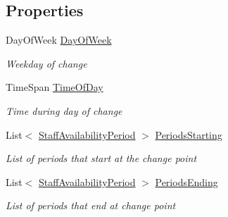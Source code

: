\subsection*{Properties}
\begin{DoxyCompactItemize}
\item 
Day\+Of\+Week \hyperlink{class_general_health_care_elements_1_1_staff_handling_1_1_staff_changing_point_a0a747e49188fd23d9830876bd79c09da}{Day\+Of\+Week}
\begin{DoxyCompactList}\small\item\em Weekday of change \end{DoxyCompactList}\item 
Time\+Span \hyperlink{class_general_health_care_elements_1_1_staff_handling_1_1_staff_changing_point_ae1e52e8a83754b946679b903b048ed95}{Time\+Of\+Day}
\begin{DoxyCompactList}\small\item\em Time during day of change \end{DoxyCompactList}\item 
List$<$ \hyperlink{class_general_health_care_elements_1_1_staff_handling_1_1_staff_availability_period}{Staff\+Availability\+Period} $>$ \hyperlink{class_general_health_care_elements_1_1_staff_handling_1_1_staff_changing_point_acc95ce624cc8b1933d607229b33bcb36}{Periods\+Starting}
\begin{DoxyCompactList}\small\item\em List of periods that start at the change point \end{DoxyCompactList}\item 
List$<$ \hyperlink{class_general_health_care_elements_1_1_staff_handling_1_1_staff_availability_period}{Staff\+Availability\+Period} $>$ \hyperlink{class_general_health_care_elements_1_1_staff_handling_1_1_staff_changing_point_abc95ddf536eb91d042bf53b3d281485e}{Periods\+Ending}
\begin{DoxyCompactList}\small\item\em List of periods that end at change point \end{DoxyCompactList}\end{DoxyCompactItemize}


